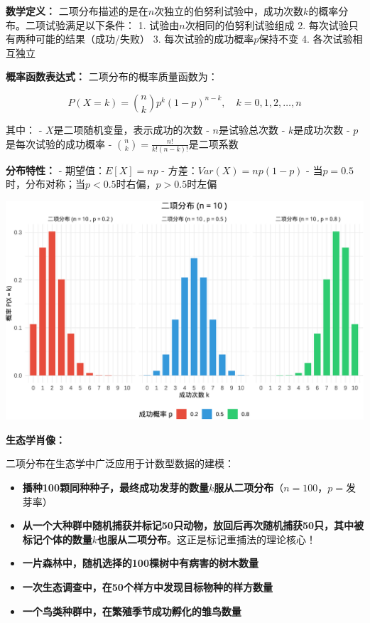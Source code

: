 \documentclass[
]{book}
\providecommand{\tightlist}{%
  \setlength{\itemsep}{0pt}\setlength{\parskip}{0pt}}
\begin{document}
\textbf{数学定义：} 二项分布描述的是在\(n\)次独立的伯努利试验中，成功次数\(k\)的概率分布。二项试验满足以下条件：
1. 试验由\(n\)次相同的伯努利试验组成
2. 每次试验只有两种可能的结果（成功/失败）
3. 每次试验的成功概率\(p\)保持不变
4. 各次试验相互独立

\textbf{概率函数表达式：} 二项分布的概率质量函数为：

\[P(X = k) = \binom{n}{k} p^k (1-p)^{n-k}, \quad k = 0, 1, 2, \ldots, n\]

其中：
- \(X\)是二项随机变量，表示成功的次数
- \(n\)是试验总次数
- \(k\)是成功次数
- \(p\)是每次试验的成功概率
- \(\binom{n}{k} = \frac{n!}{k!(n-k)!}\)是二项系数

\textbf{分布特性：}
- 期望值：\(E[X] = np\)
- 方差：\(Var(X) = np(1-p)\)
- 当\(p=0.5\)时，分布对称；当\(p<0.5\)时右偏，\(p>0.5\)时左偏

\begin{center}\includegraphics[width=0.8\linewidth]{ecological-statistics_files/figure-latex/unnamed-chunk-21-1} \end{center}

\textbf{生态学肖像：}

二项分布在生态学中广泛应用于计数型数据的建模：

\begin{itemize}
\tightlist
\item
  \textbf{播种100颗同种种子，最终成功发芽的数量\(k\)服从二项分布}（\(n=100\)，\(p=\)发芽率）
\item
  \textbf{从一个大种群中随机捕获并标记50只动物，放回后再次随机捕获50只，其中被标记个体的数量\(k\)也服从二项分布}。这正是标记重捕法的理论核心！
\item
  \textbf{一片森林中，随机选择的100棵树中有病害的树木数量}
\item
  \textbf{一次生态调查中，在50个样方中发现目标物种的样方数量}
\item
  \textbf{一个鸟类种群中，在繁殖季节成功孵化的雏鸟数量}
\end{itemize}
\end{document}
